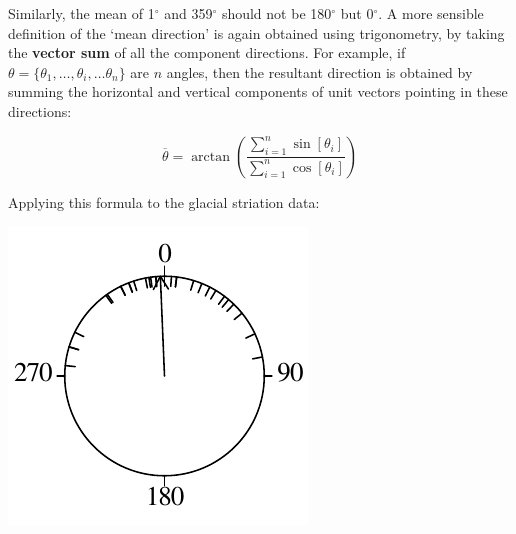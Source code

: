 Similarly, the mean of 1$^\circ$ and 359$^\circ$ should not be
180$^\circ$ but 0$^\circ$. A more sensible definition of the `mean
direction' is again obtained using trigonometry, by taking the
\textbf{vector sum} of all the component directions. For example, if
$\theta = \{\theta_1, \ldots, \theta_i, \ldots \theta_n \}$ are $n$
angles, then the resultant direction is obtained by summing the
horizontal and vertical components of unit vectors pointing in these
directions:

\begin{equation}
  \overline{\theta} = \arctan\left(\frac{\sum_{i=1}^{n}
    \sin[\theta_i]}{\sum_{i=1}^{n}\cos[\theta_i]} \right)
  \label{eq:averagedirection}
\end{equation}

Applying this formula to the glacial striation data:

\noindent\begin{minipage}[t][][b]{.2\textwidth}
\includegraphics[width=\textwidth]{../figures/circle3.pdf}\\
\end{minipage}
\begin{minipage}[t][][t]{.8\textwidth}
  \label{fig:circle3}
\end{minipage}

